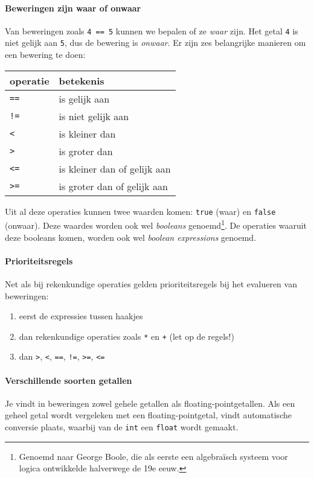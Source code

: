 \paragraph{Beweringen zijn waar of onwaar}

Van beweringen zoals \texttt{4\,==\,5} kunnen we bepalen of ze \emph{waar} zijn. Het getal \texttt{4} is niet gelijk aan \texttt{5}, dus de bewering is \emph{onwaar}. Er zijn zes belangrijke manieren om een bewering te doen:

\begin{center}
\begin{tabular}{ll}
\textbf{operatie} &        \textbf{betekenis}\\
\midrule
      \texttt{==} &               is gelijk aan\\
      \texttt{!=} &          is niet gelijk aan\\
       \texttt{<} &              is kleiner dan\\
       \texttt{>} &               is groter dan\\
      \texttt{<=} & is kleiner dan of gelijk aan\\
      \texttt{>=} & is groter dan of gelijk aan\\
\midrule
\end{tabular}
\end{center}

Uit al deze operaties kunnen twee waarden komen: \texttt{true} (waar) en \texttt{false} (onwaar). Deze waardes worden ook wel \emph{booleans} genoemd\footnote{Genoemd naar George Boole, die als eerste een algebraïsch systeem voor logica ontwikkelde halverwege de 19e eeuw.}. De operaties waaruit deze booleans komen, worden ook wel \emph{boolean expressions} genoemd.

\paragraph{Prioriteitsregels}

Net als bij rekenkundige operaties gelden prioriteitsregels bij het evalueren van beweringen:

\begin{enumerate}
  \item eerst de expressies tussen haakjes
  \item dan rekenkundige operaties zoals \texttt{*} en \texttt{+} (let op de regels!)
  \item dan \texttt{>}, \texttt{<}, \texttt{==}, \texttt{!=}, \texttt{>=}, \texttt{<=}
\end{enumerate}


\paragraph{Verschillende soorten getallen}

Je vindt in beweringen zowel gehele getallen als floating-pointgetallen. Als een geheel getal wordt vergeleken met een floating-pointgetal, vindt automatische conversie plaats, waarbij van de \texttt{int} een \texttt{float} wordt gemaakt.
